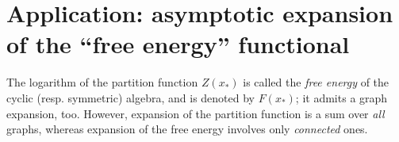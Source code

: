 

\section{Application: asymptotic expansion of the ``free energy'' functional}
The logarithm of the partition function $Z(x_*)$ is called the
\emph{free energy} of the cyclic (resp. symmetric) algebra, and is
denoted by $F(x_*)$; it admits a graph expansion, too. However,
expansion of the partition function is a sum over \emph{all} graphs,
whereas expansion of the free energy involves only \emph{connected}
ones.

